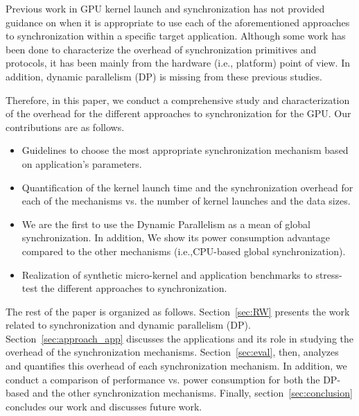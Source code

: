 \documentclass[conference]{IEEEtran}
\begin{document}
Previous work in GPU kernel launch and synchronization has not provided guidance on when it is appropriate to use each of the aforementioned approaches to synchronization within a specific target application.
Although some work has been done to characterize the overhead of synchronization primitives and protocols, it has been mainly from the hardware (i.e., platform) point of view. In addition, dynamic parallelism (DP) is missing from these previous studies. 

Therefore, in this paper, we conduct a comprehensive study and characterization of the overhead for the different approaches to synchronization for the GPU.
Our contributions are as follows. 
\begin{itemize}
	\item
	Guidelines to choose the most appropriate synchronization mechanism based on application's parameters.
	\item
	Quantification of the kernel launch time and the synchronization overhead for each of the mechanisms vs. the number of kernel launches and the data sizes. 
	\item
	We are the first to use the Dynamic Parallelism as a mean of global synchronization. In addition, We show its power consumption advantage compared to the other mechanisms (i.e.,CPU-based global synchronization). 
	\item
	Realization of synthetic micro-kernel and application benchmarks to stress-test the different approaches to synchronization. 
\end{itemize}

The rest of the paper is organized as follows. Section~\ref{sec:RW} presents the work related to synchronization and dynamic parallelism (DP). Section~\ref{sec:approach_app} discusses the applications and its role in studying the overhead of the synchronization mechanisms. Section~\ref{sec:eval}, then, analyzes and quantifies this overhead of each synchronization mechanism. In addition, we conduct a comparison of performance vs. power consumption for both the DP-based and the other synchronization mechanisms. Finally, section~\ref{sec:conclusion} concludes our work and discusses future work.
\end{document}
